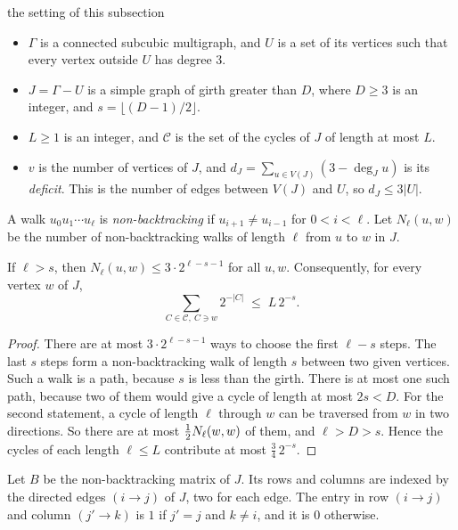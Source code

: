 \begin{notation}{the setting of this subsection}
\begin{itemize}[leftmargin=1.2em]
\item $\Gamma$ is a connected subcubic multigraph, and $U$ is a set of its vertices such that
every vertex outside $U$ has degree $3$.
\item $J=\Gamma-U$ is a simple graph of girth greater than $D$, where $D\ge3$ is an integer, and
$s=\lfloor(D-1)/2\rfloor$.
\item $L\ge1$ is an integer, and $\mathcal{C}$ is the set of the cycles of $J$ of length at most
$L$.
\item $v$ is the number of vertices of $J$, and $d_J=\sum_{u\in V(J)}(3-\deg_Ju)$ is its
\emph{deficit}. This is the number of edges between $V(J)$ and $U$, so $d_J\le3|U|$.
\end{itemize}
\end{notation}

A walk $u_0u_1\cdots u_\ell$ is \emph{non-backtracking} if $u_{i+1}\ne u_{i-1}$ for $0<i<\ell$. Let
$N_\ell(u,w)$ be the number of non-backtracking walks of length $\ell$ from $u$ to $w$ in $J$.

\begin{lemma}\label{lem:walks}
If $\ell>s$, then $N_\ell(u,w)\le3\cdot2^{\ell-s-1}$ for all $u,w$. Consequently, for every vertex
$w$ of $J$,
\begin{equation}\label{eq:load}
  \sum_{C\in\mathcal{C},\ C\ni w}2^{-|C|}\;\le\;L\,2^{-s}.
\end{equation}
\end{lemma}

\begin{proof}
There are at most $3\cdot2^{\ell-s-1}$ ways to choose the first $\ell-s$ steps. The last $s$ steps
form a non-backtracking walk of length $s$ between two given vertices. Such a walk is a path,
because $s$ is less than the girth. There is at most one such path, because two of them would give
a cycle of length at most $2s<D$. For the second statement, a cycle of length $\ell$ through $w$
can be traversed from $w$ in two directions. So there are at most $\tfrac12 N_\ell(w,w)$ of them, and
$\ell>D>s$. Hence the cycles of each length $\ell\le L$ contribute at most $\frac34\,2^{-s}$.
\end{proof}

Let $B$ be the non-backtracking matrix of $J$. Its rows and columns are indexed by the directed
edges $(i\to j)$ of $J$, two for each edge. The entry in row $(i\to j)$ and column $(j'\to k)$ is
$1$ if $j'=j$ and $k\ne i$, and it is $0$ otherwise.

